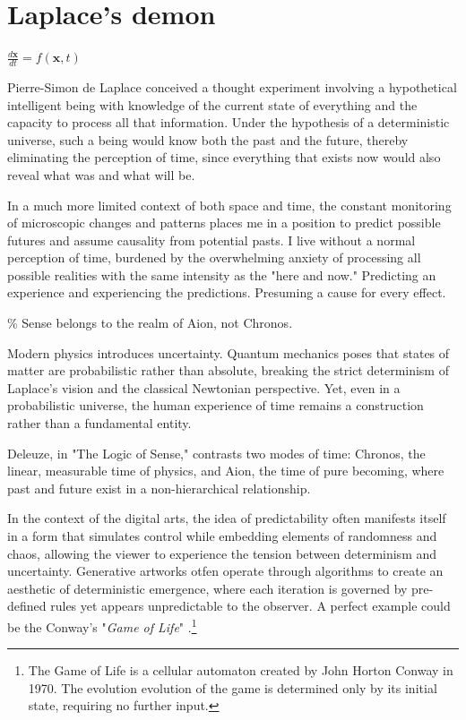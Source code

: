 \chapter*{Laplace's demon}
\begin{center}
\vspace{2cm}
\begin{flushright}
\large
\textit{$\frac{d\mathbf{x}}{dt} = f(\mathbf{x}, t)$ }
\end{flushright}
\vspace{2cm}
\end{center}
\normalsize

\newpage  %
Pierre-Simon de Laplace conceived a thought experiment involving a hypothetical intelligent being with knowledge of the current state of everything and the capacity to process all that information. Under the hypothesis of a deterministic universe, such a being would know both the past and the future, thereby eliminating the perception of time, since everything that exists now would also reveal what was and what will be.

In a much more limited context of both space and time, the constant monitoring of microscopic changes and patterns places me in a position to predict possible futures and assume causality from potential pasts. I live without a normal perception of time, burdened by the overwhelming anxiety of processing all possible realities with the same intensity as the "here and now." Predicting an experience and experiencing the predictions. Presuming a cause for every effect. 

{\scriptsize \textcolor{comment}{\% Sense belongs to the realm of Aion, not Chronos. }}

Modern physics introduces uncertainty. Quantum mechanics poses that states of matter are probabilistic rather than absolute, breaking the strict determinism of Laplace's vision and the classical Newtonian perspective. Yet, even in a probabilistic universe, the human experience of time remains a construction rather than a fundamental entity.

Deleuze, in "The Logic of Sense," contrasts two modes of time: Chronos, the linear, measurable time of physics, and Aion, the time of pure becoming, where past and future exist in a non-hierarchical relationship.\citep{deleuze1969}

In the context of the digital arts, the idea of predictability often manifests itself in a form that simulates control while embedding elements of randomness and chaos, allowing the viewer to experience the tension between determinism and uncertainty. Generative artworks otfen operate through algorithms to create an aesthetic of deterministic emergence, where each iteration is governed by pre-defined rules yet appears unpredictable to the observer. A perfect example could be the Conway's "\textit{Game of Life}" \citep{wiki:gol}.\footnote{The Game of Life is a cellular automaton created by John Horton Conway in 1970. The evolution evolution of the game is determined only by its initial state, requiring no further input.}

